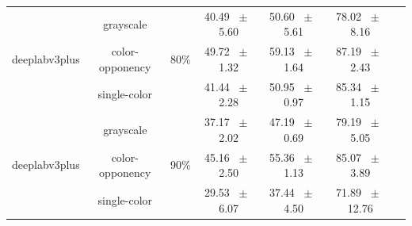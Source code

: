 \begin{table}[h]
\begin{tabular}{@{}lccc ccc@{}}
    \midrule
    \multirow{3}{*}{deeplabv3plus} & grayscale & \multirow{3}{*}{80\%} & 40.49 ~$\pm$~ 5.60 & 50.60 ~$\pm$~ 5.61 & 78.02 ~$\pm$~ 8.16 \\
    & color-opponency & & 49.72 ~$\pm$~ 1.32 & 59.13 ~$\pm$~ 1.64 & 87.19 ~$\pm$~ 2.43 \\
    & single-color & & 41.44 ~$\pm$~ 2.28 & 50.95 ~$\pm$~ 0.97 & 85.34 ~$\pm$~ 1.15 \\
    \midrule
    \multirow{3}{*}{deeplabv3plus} & grayscale & \multirow{3}{*}{90\%} & 37.17 ~$\pm$~ 2.02 & 47.19 ~$\pm$~ 0.69 & 79.19 ~$\pm$~ 5.05 \\
    & color-opponency & & 45.16 ~$\pm$~ 2.50 & 55.36 ~$\pm$~ 1.13 & 85.07 ~$\pm$~ 3.89 \\
    & single-color & & 29.53 ~$\pm$~ 6.07 & 37.44 ~$\pm$~ 4.50 & 71.89 ~$\pm$~ 12.76 \\
    \midrule
    \bottomrule
  \end{tabular}
  \label{tab:sparse_deeplabv3plus_acdc_fog}
\end{table}